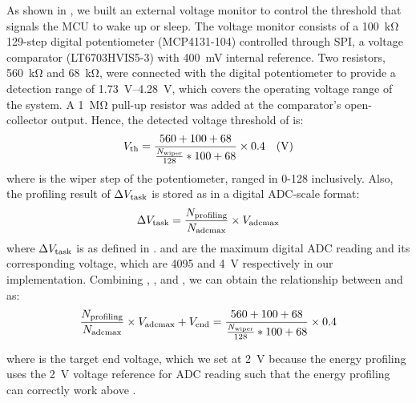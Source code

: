 As shown in , we built an external voltage monitor to control the threshold that signals the MCU to wake up or sleep. 
The voltage monitor consists of a \SI{100}{\kilo\ohm} 129-step digital potentiometer (MCP4131-104) controlled through SPI, a voltage comparator (LT6703HVIS5-3) with \SI{400}{\milli\volt} internal reference. 
Two resistors, \SI{560}{\kilo\ohm} and \SI{68}{\kilo\ohm}, were connected with the digital potentiometer to provide a detection range of \SIrange{1.73}{4.28}{\volt}, which covers the operating voltage range of the system. 
A \SI{1}{\mega\ohm} pull-up resistor was added at the comparator's open-collector output.
Hence, the detected voltage threshold of  is:
\begin{equation}
    V_{\text{th}} = \frac{560 + 100 + 68}{\frac{N_{\text{wiper}}}{128} * 100 + 68} \times 0.4 \quad(\SI{}{\volt})
    \label{eq:pot_thr}
\end{equation}
where  is the wiper step of the potentiometer, ranged in 0-128 inclusively. 
Also, the profiling result of $\Delta V_{\text{task}}$ is stored as  in a digital ADC-scale format:
\begin{equation}
    \Delta V_{\text{task}} = \frac{N_{\text{profiling}}}{N_{\text{adcmax}}} \times V_{\text{adcmax}} 
    \label{eq:digit_profiling_result}
\end{equation}
where $\Delta V_{\text{task}}$ is as defined in .  and  are the maximum digital ADC reading and its corresponding voltage, which are 4095 and \SI{4}{\volt} respectively in our implementation.
Combining , , and , we can obtain the relationship between  and  as:
\begin{equation}
    \frac{N_{\text{profiling}}}{N_{\text{adcmax}}} \times V_{\text{adcmax}} + V_{\text{end}} = \frac{560 + 100 + 68}{\frac{N_{\text{wiper}}}{128} * 100 + 68} \times 0.4
    \label{eq:adc_thr}
\end{equation}

where  is the target end voltage, which we set at \SI{2}{\volt} because the energy profiling  uses the \SI{2}{\volt} voltage reference for ADC reading such that the energy profiling can correctly work above . 

